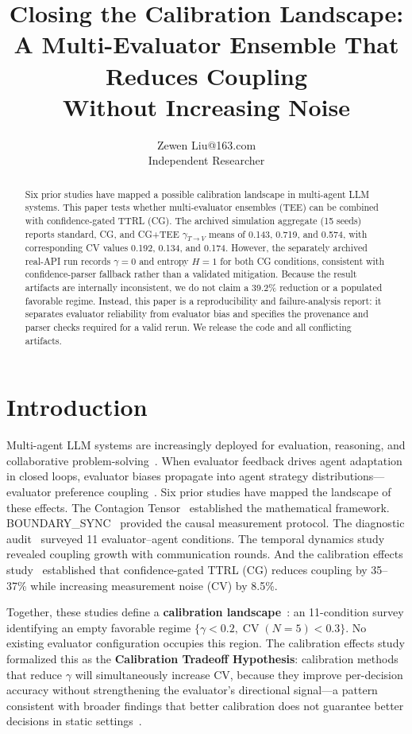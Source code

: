 \documentclass[11pt]{article}
\title{Closing the Calibration Landscape: \\ A Multi-Evaluator Ensemble That Reduces Coupling \\ Without Increasing Noise}
\author{\name Zewen Liu\email 17353895263@163.com\\\addr Independent Researcher}
\date{}
\DeclareMathOperator{\CV}{CV}
\begin{document}
\maketitle

\begin{abstract}
Six prior studies have mapped a possible calibration landscape in multi-agent LLM systems. This paper tests whether multi-evaluator ensembles (TEE) can be combined with confidence-gated TTRL (CG). The archived simulation aggregate (15 seeds) reports standard, CG, and CG+TEE $\gamma_{T\to V}$ means of 0.143, 0.719, and 0.574, with corresponding CV values 0.192, 0.134, and 0.174. However, the separately archived real-API run records $\gamma=0$ and entropy $H=1$ for both CG conditions, consistent with confidence-parser fallback rather than a validated mitigation. Because the result artifacts are internally inconsistent, we do not claim a 39.2\% reduction or a populated favorable regime. Instead, this paper is a reproducibility and failure-analysis report: it separates evaluator reliability from evaluator bias and specifies the provenance and parser checks required for a valid rerun. We release the code and all conflicting artifacts.
\end{abstract}

\newpage

\section{Introduction}

Multi-agent LLM systems are increasingly deployed for evaluation, reasoning, and collaborative problem-solving~\cite{zheng2023judging,chiang2024chatbot,li2023camel,wu2024autogen,snell2024scaling}. When evaluator feedback drives agent adaptation in closed loops, evaluator biases propagate into agent strategy distributions---evaluator preference coupling~\cite{liu2026epc}. Six prior studies have mapped the landscape of these effects. The Contagion Tensor~\cite{liu2026tensor} established the mathematical framework. BOUNDARY\_SYNC~\cite{liu2026boundarysync} provided the causal measurement protocol. The diagnostic audit~\cite{liu2026audit} surveyed 11 evaluator--agent conditions. The temporal dynamics study~\cite{liu2026temporal} revealed coupling growth with communication rounds. And the calibration effects study~\cite{liu2026caleffects} established that confidence-gated TTRL (CG) reduces coupling by 35--37\% while increasing measurement noise (CV) by 8.5\%.

Together, these studies define a \textbf{calibration landscape}~\cite{liu2026caleffects}: an 11-condition survey identifying an empty favorable regime $\{\gamma < 0.2, \CV(N{=}5) < 0.3\}$. No existing evaluator configuration occupies this region. The calibration effects study formalized this as the \textbf{Calibration Tradeoff Hypothesis}: calibration methods that reduce $\gamma$ will simultaneously increase CV, because they improve per-decision accuracy without strengthening the evaluator's directional signal---a pattern consistent with broader findings that better calibration does not guarantee better decisions in static settings~\cite{guo2017calibration,he2026paradox}.
\end{document}
